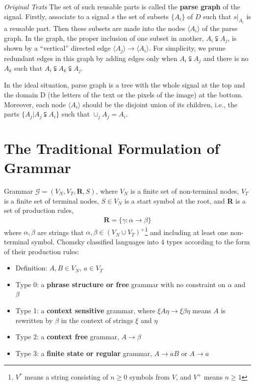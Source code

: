 \documentclass[10pt,oneside]{book}
\newenvironment{book_quote}[1]
{%
  \mdfsetup{%
    frametitle={\colorbox{white}{\space#1\space}},
    frametitleaboveskip=-\ht\strutbox,
  }
  \begin{mdframed}
}
{
  \end{mdframed}
}
\begin{document}
\begin{book_quote}{\textit{Original Texts}}
  The set of such reusable parts is called the \textbf{parse graph} of the
  signal. Firstly, associate to a signal $s$ the set of subsets $\{A_i\}$ of
  $D$ such that $s\vert_{A_i}$ is a reusable part. Then these subsets are made
  into the nodes $\langle A_i \rangle$ of the parse graph. In the graph, the
  proper inclusion of one subset in another, $A_i \subsetneqq A_j$, is shown by
  a ``vertical'' directed edge
  $\langle A_j \rangle \rightarrow \langle A_i \rangle$. For simplicity, we
  prune redundant edges in this graph by adding edges only when
  $A_i \subsetneqq A_j$ and there is no $A_k$ such that
  $A_i \subsetneqq A_k \subsetneqq A_j$.

  \par
  In the ideal situation, parse graph is a tree with the whole signal at the
  top and the domain D (the letters of the text or the pixels of the image) at
  the bottom. Moreover, each node $\langle A_i \rangle$ should be the disjoint
  union of its children, i.e., the parts $\{A_j \vert A_j \subsetneqq A_i\}$
  such that $\cup_j A_j = A_i$.
\end{book_quote}

\section{The Traditional Formulation of Grammar}%
\label{sec:1.2}
Grammar $\mathcal{G} = (V_N, V_T, \mathbf{R}, S)$, where $V_N$ is a finite
set of non-terminal nodes, $V_T$ is a finite set of terminal nodes, $S \in V_N$
is a start symbol at the root, and \textbf{R} is a set of production rules,
%
\begin{align}
  \label{eq:1.2}
  \mathbf{R} = \{\gamma: \alpha \rightarrow \beta\}
\end{align}
%
where $\alpha, \beta$ are strings that
$\alpha, \beta \in {(V_N \cup V_T)}^+$\footnote{$V^*$ means a string consisting
of $n \geq 0$ symbols from $V$, and $V^+$ means $n \geq 1$} and including at
least one non-terminal symbol. Chomsky classified languages into 4 types
according to the form of their production rules:
%
\begin{itemize}
  \item Definition: $A, B \in V_N$, $a \in V_T$
  \item Type 0: a \textbf{phrase structure or free} grammar with no constraint
    on $\alpha$ and $\beta$
  \item Type 1: a \textbf{context sensitive} grammar, where
    $\xi A \eta \rightarrow \xi \beta \eta$ means $A$ is rewritten by $\beta$
    in the context of strings $\xi$ and $\eta$
  \item Type 2: a \textbf{context free} grammar, $A \rightarrow \beta$
  \item Type 3: a \textbf{finite state or regular} grammar,
    $A \rightarrow aB$ or $A \rightarrow a$
\end{itemize}
%
\end{document}
